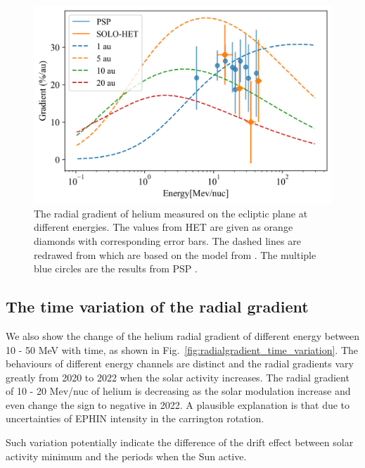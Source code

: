\begin{figure}[!htb]
    \centering
    \includegraphics{images/ACR/Energydependent_normal_mask20230612.png}
    \caption[Energy dependency of helium radial gradient]{The radial gradient of helium measured on the ecliptic plane at different energies. The values from \ac{HET} are given as orange diamonds with corresponding error bars. The dashed lines are redrawed from \citet{Rankin2021ApJ} which are based on the model from \citet{Strauss2010JGRA}. The multiple blue circles are the results from \ac{PSP} \citep{Rankin2021ApJ}.}
    \label{fig:comparison_SOLO_PSP}
\end{figure}



\subsection*{The time variation of the radial gradient}

We also show the change of the helium radial gradient of different energy between 10 - 50 MeV with time, as shown in Fig.~\ref{fig:radialgradient_time_variation}. The behaviours of different energy channels are distinct and the radial gradients vary greatly from 2020 to 2022 when the solar activity increases. 
The radial gradient of 10 - 20 Mev/nuc of helium is decreasing as the solar modulation increase and even change the sign to negative in 2022. A plausible explanation is that due to uncertainties of \ac{EPHIN} intensity in the carrington rotation.

Such variation potentially indicate the difference of the drift effect between solar activity minimum and the periods when the Sun active.

